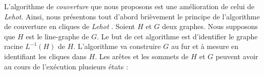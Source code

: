 L'algorithme de {\em couverture} que nous proposons est une am\'elioration de celui de {\em Lehot}.
Ainsi, nous pr\'esentons tout d'abord bri\`evement le principe de l'algorithme de couverture en cliques de {\em Lehot} \cite{decompositionEnCliquesParArcs}. 
\newline
Soient $H$ et $G$ deux graphes. Nous supposons que $H$ est le line-graphe de $G$.
Le but de cet algorithme est d'identifier le graphe racine $L^{-1}(H)$ de $H$.
L'algorithme va construire $G$  au fur et \`a mesure en identifiant les cliques dans $H$. 
Les ar\^etes et les sommets de $H$ et $G$ peuvent avoir au cours de l'ex\'ecution plusieurs \'etats :
